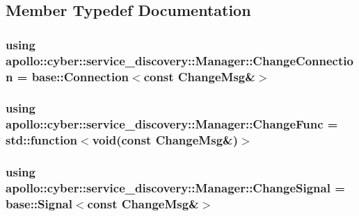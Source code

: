 \subsection{Member Typedef Documentation}
\hypertarget{classapollo_1_1cyber_1_1service__discovery_1_1Manager_ab43fa282f6aa1b3b1180a1e416b98b68}{
\subsubsection[{Change\-Connection}]{\setlength{\rightskip}{0pt plus 5cm}using {\bf apollo\-::cyber\-::service\-\_\-discovery\-::\-Manager\-::\-Change\-Connection} =  {\bf base\-::\-Connection}$<$const Change\-Msg\&$>$}}\label{classapollo_1_1cyber_1_1service__discovery_1_1Manager_ab43fa282f6aa1b3b1180a1e416b98b68}
\hypertarget{classapollo_1_1cyber_1_1service__discovery_1_1Manager_a1e08b690a5829fbabeb6d3aea5ab8320}{
\subsubsection[{Change\-Func}]{\setlength{\rightskip}{0pt plus 5cm}using {\bf apollo\-::cyber\-::service\-\_\-discovery\-::\-Manager\-::\-Change\-Func} =  std\-::function$<$void(const Change\-Msg\&)$>$}}\label{classapollo_1_1cyber_1_1service__discovery_1_1Manager_a1e08b690a5829fbabeb6d3aea5ab8320}
\hypertarget{classapollo_1_1cyber_1_1service__discovery_1_1Manager_a9730b844d88e23f65d5dcbcfca1a7d59}{
\subsubsection[{Change\-Signal}]{\setlength{\rightskip}{0pt plus 5cm}using {\bf apollo\-::cyber\-::service\-\_\-discovery\-::\-Manager\-::\-Change\-Signal} =  {\bf base\-::\-Signal}$<$const Change\-Msg\&$>$}}\label{classapollo_1_1cyber_1_1service__discovery_1_1Manager_a9730b844d88e23f65d5dcbcfca1a7d59}
